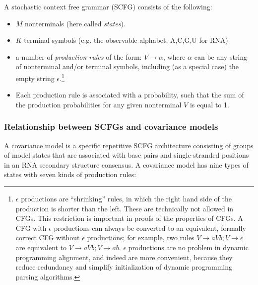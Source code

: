\documentclass[11pt]{article}
\begin{document}
A stochastic context free grammar (SCFG) consists of the following:

\begin{itemize}
\item $M$ nonterminals (here called \emph{states}).
\item $K$ terminal symbols (e.g. the observable alphabet, {A,C,G,U} for RNA)
\item a number of \emph{production rules} of the form: $V \rightarrow
\alpha$, where $\alpha$ can be any string of nonterminal and/or
terminal symbols, including (as a special case) the empty string
$\epsilon$.\footnote{$\epsilon$ productions are ``shrinking'' rules,
in which the right hand side of the production is shorter than the
left. These are technically not allowed in CFGs. This restriction is
important in proofs of the properties of CFGs. A CFG with $\epsilon$
productions can always be converted to an equivalent, formally correct
CFG without $\epsilon$ productions; for example, two rules $V
\rightarrow a V b; V \rightarrow \epsilon$ are equivalent to $V
\rightarrow a V b; V \rightarrow ab$. $\epsilon$ productions are no
problem in dynamic programming alignment, and indeed are more
convenient, because they reduce redundancy and simplify initialization
of dynamic programming parsing algorithms.}
\item Each production rule is associated with a probability, such that
      the sum of the production probabilities for any given
      nonterminal $V$ is equal to 1.
\end{itemize} 

\subsubsection{Relationship between SCFGs and covariance models}

A covariance model is a specific repetitive SCFG architecture
consisting of groups of model states that are associated with base
pairs and single-stranded positions in an RNA secondary structure
consensus. A covariance model has nine types of states with seven
kinds of production rules:
\end{document}
